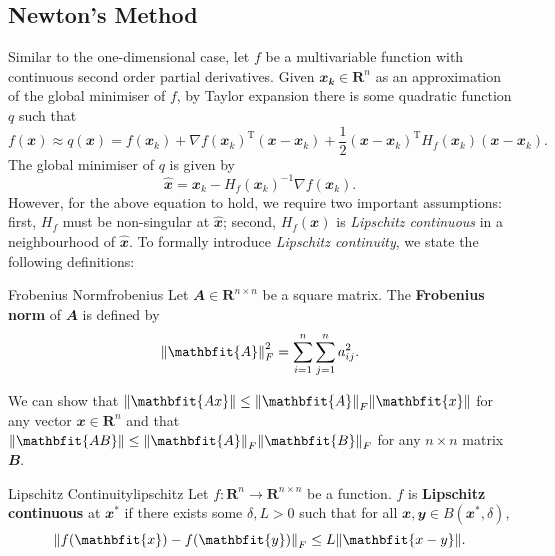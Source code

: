 \documentclass[math, code]{amznotes}
\theoremstyle{remark}
\begin{document}
\subsection{Newton's Method}
Similar to the one-dimensional case, let $f$ be a multivariable function with continuous second order partial derivatives. Given $\mathbfit{x_k} \in \mathbf{R}^n$ as an approximation of the global minimiser of $f$, by Taylor expansion there is some quadratic function $q$ such that
\begin{equation*}
    f(\mathbfit{x}) \approx q(\mathbfit{x}) = f(\mathbfit{x}_k) + \nabla f(\mathbfit{x}_k)^{\mathrm{T}}(\mathbfit{x} - \mathbfit{x}_k) + \frac{1}{2}(\mathbfit{x} - \mathbfit{x}_k)^{\mathrm{T}}H_f(\mathbfit{x}_k)(\mathbfit{x} - \mathbfit{x}_k).
\end{equation*}
The global minimiser of $q$ is given by
\begin{equation*}
    \hat{\mathbfit{x}} = \mathbfit{x}_k - H_f(\mathbfit{x}_k)^{-1}\nabla f(\mathbfit{x}_k).
\end{equation*}
However, for the above equation to hold, we require two important assumptions: first, $H_f$ must be non-singular at $\hat{\mathbfit{x}}$; second, $H_f(\mathbfit{x})$ is \textit{Lipschitz continuous} in a neighbourhood of $\hat{\mathbfit{x}}$. To formally introduce \textit{Lipschitz continuity}, we state the following definitions:
\begin{dfnbox}{Frobenius Norm}{frobenius}
    Let $\mathbfit{A} \in \mathbf{R}^{n \times n}$ be a square matrix. The {\color{red} \textbf{Frobenius norm}} of $\mathbfit{A}$ is defined by
    \begin{equation*}
        \norm{\mathbfit{A}}^2_F = \sum_{i = 1}^{n}\sum_{j = 1}^{n}a_{ij}^2.
    \end{equation*}
\end{dfnbox}
We can show that $\norm{\mathbfit{Ax}} \leq \norm{\mathbfit{A}}_F\norm{\mathbfit{x}}$ for any vector $\mathbfit{x} \in \mathbf{R}^n$ and that $\norm{\mathbfit{AB}} \leq \norm{\mathbfit{A}}_F\norm{\mathbfit{B}}_F$ for any $n \times n$ matrix $\mathbfit{B}$.
\begin{dfnbox}{Lipschitz Continuity}{lipschitz}
    Let $f \colon \mathbf{R}^n \to \mathbf{R}^{n \times n}$ be a function. $f$ is {\color{red} \textbf{Lipschitz continuous}} at $\mathbfit{x}^*$ if there exists some $\delta, L > 0$ such that for all $\mathbfit{x}, \mathbfit{y} \in B(\mathbfit{x}^*, \delta)$,
    \begin{equation*}
        \norm{f(\mathbfit{x}) - f(\mathbfit{y})}_F \leq L\norm{\mathbfit{x - y}}.
    \end{equation*}
\end{dfnbox}
\end{document}
